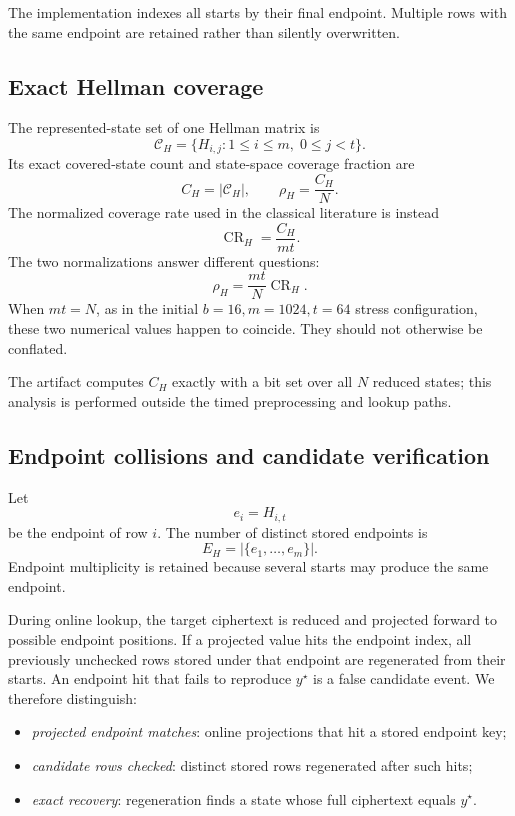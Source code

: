 The implementation indexes all starts by their final endpoint.  Multiple rows
with the same endpoint are retained rather than silently overwritten.

\subsection{Exact Hellman coverage}

The represented-state set of one Hellman matrix is
\begin{equation}
    \mathcal C_H
    =
    \{H_{i,j}:1\leq i\leq m,\;0\leq j<t\}.
    \label{eq:hellman-coverage-set}
\end{equation}
Its exact covered-state count and state-space coverage fraction are
\[
    C_H=|\mathcal C_H|,
    \qquad
    \rho_H=\frac{C_H}{N}.
\]
The normalized coverage rate used in the classical literature is instead
\[
    \operatorname{CR}_H=\frac{C_H}{mt}.
\]
The two normalizations answer different questions:
\[
    \rho_H
      =
      \frac{mt}{N}\operatorname{CR}_H.
\]
When $mt=N$, as in the initial $b=16,m=1024,t=64$ stress configuration, these
two numerical values happen to coincide.  They should not otherwise be
conflated.

The artifact computes $C_H$ exactly with a bit set over all $N$ reduced states;
this analysis is performed outside the timed preprocessing and lookup paths.

\subsection{Endpoint collisions and candidate verification}

Let
\[
    e_i=H_{i,t}
\]
be the endpoint of row $i$.  The number of distinct stored endpoints is
\[
    E_H=\left|\{e_1,\ldots,e_m\}\right|.
\]
Endpoint multiplicity is retained because several starts may produce the same
endpoint.

During online lookup, the target ciphertext is reduced and projected forward
to possible endpoint positions.  If a projected value hits the endpoint
index, all previously unchecked rows stored under that endpoint are regenerated
from their starts.  An endpoint hit that fails to reproduce $y^\star$ is a
false candidate event.  We therefore distinguish:

\begin{itemize}
  \item \emph{projected endpoint matches}: online projections that hit a stored
        endpoint key;
  \item \emph{candidate rows checked}: distinct stored rows regenerated after
        such hits;
  \item \emph{exact recovery}: regeneration finds a state whose full
        ciphertext equals $y^\star$.
\end{itemize}

